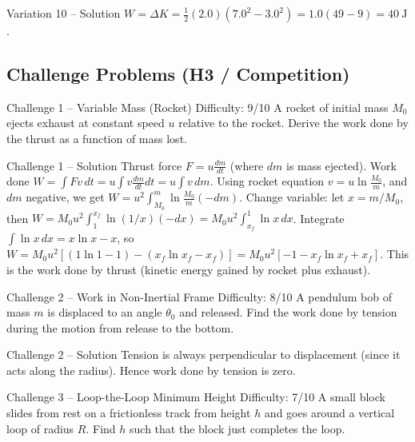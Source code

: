\documentclass[11pt]{beamer}
\begin{document}
\begin{frame}{Variation 10 – Solution}
$W = \Delta K = \frac12 (2.0)(7.0^2 - 3.0^2) = 1.0(49-9) = 40\ \mathrm{J}$.
\end{frame}

\subsection{Challenge Problems (H3 / Competition)}

\begin{frame}[shrink=15]{Challenge 1 – Variable Mass (Rocket) \hfill Difficulty: 9/10}
A rocket of initial mass $M_0$ ejects exhaust at constant speed $u$ relative to the rocket. Derive the work done by the thrust as a function of mass lost.
\end{frame}

\begin{frame}{Challenge 1 – Solution}
Thrust force $F = u \frac{dm}{dt}$ (where $dm$ is mass ejected). Work done $W = \int F v\, dt = u \int v \frac{dm}{dt} dt = u \int v\, dm$.
Using rocket equation $v = u \ln\frac{M_0}{m}$, and $dm$ negative, we get $W = u^2 \int_{M_0}^{m} \ln\frac{M_0}{m} (-dm)$.
Change variable: let $x = m/M_0$, then $W = M_0 u^2 \int_1^{x_f} \ln(1/x) (-dx) = M_0 u^2 \int_{x_f}^1 \ln x\, dx$.
Integrate $\int \ln x\, dx = x\ln x - x$, so $W = M_0 u^2 [ (1\ln1 -1) - (x_f \ln x_f - x_f) ] = M_0 u^2 [ -1 - x_f \ln x_f + x_f]$.
This is the work done by thrust (kinetic energy gained by rocket plus exhaust).
\end{frame}

\begin{frame}[shrink=15]{Challenge 2 – Work in Non-Inertial Frame \hfill Difficulty: 8/10}
A pendulum bob of mass $m$ is displaced to an angle $\theta_0$ and released. Find the work done by tension during the motion from release to the bottom.
\end{frame}

\begin{frame}{Challenge 2 – Solution}
Tension is always perpendicular to displacement (since it acts along the radius). Hence work done by tension is zero.
\end{frame}

\begin{frame}[shrink=15]{Challenge 3 – Loop-the-Loop Minimum Height \hfill Difficulty: 7/10}
A small block slides from rest on a frictionless track from height $h$ and goes around a vertical loop of radius $R$. Find $h$ such that the block just completes the loop.
\end{frame}
\end{document}
